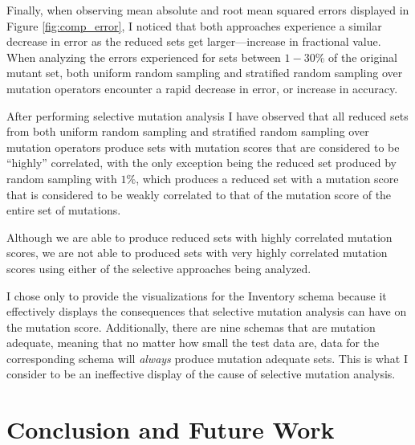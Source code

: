 \documentclass[conference]{IEEEtran}
\begin{document}
Finally, when observing mean absolute and root mean squared errors displayed in Figure \ref{fig:comp_error},
I noticed that both approaches experience a similar decrease in error as the reduced sets
get larger---increase in fractional value. When analyzing the errors experienced for sets between
$1 - 30\%$ of the original mutant set, both uniform random sampling and stratified random sampling over mutation operators
encounter a rapid decrease in error, or increase in accuracy.

After performing selective mutation analysis I have observed that all reduced sets from both
uniform random sampling and stratified random sampling over mutation operators produce sets with mutation scores that are
considered to be ``highly'' correlated, with the only exception
being the reduced set produced by random sampling with $1\%$, which produces a reduced set with a mutation score that is considered
to be weakly correlated to that of the mutation score of the entire set of mutations.

Although we are able to produce
reduced sets with highly correlated mutation scores, we are not able to produced sets with
very highly correlated mutation scores using either of the selective approaches being analyzed.

I chose only to provide the visualizations for the Inventory schema because it effectively displays
the consequences that selective mutation analysis can have on the mutation score. Additionally,
there are nine schemas that are mutation adequate, meaning that no matter how small the test data
are, data for the corresponding schema will \textit{always} produce mutation adequate sets. This is what I consider
to be an ineffective display of the cause of selective mutation analysis.

\begin{figure*}[!ht]
\centering
{}
\hfil
{}
\caption{The errors for uniform random sampling and stratified random sampling over operators for the Inventory schema.}
\label{fig:comp_error}
\end{figure*}

\section{Conclusion and Future Work}
\end{document}

